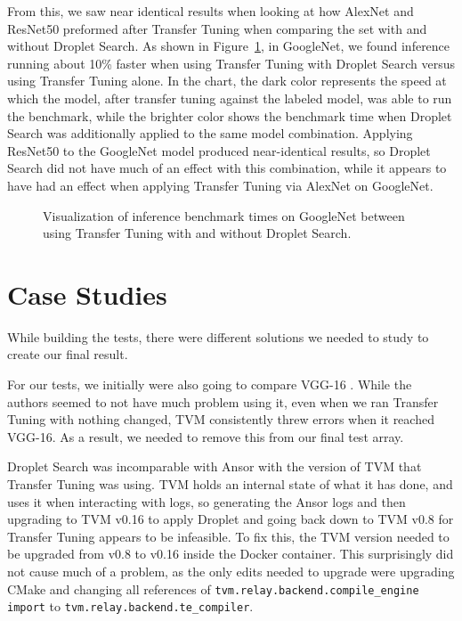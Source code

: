 \documentclass[conference]{IEEEtran}
\begin{document}
From this, we saw near identical results when looking at how AlexNet and ResNet50 preformed after Transfer Tuning when comparing the set with and without Droplet Search. As shown in Figure~\ref{fig}, in GoogleNet, we found inference running about 10\% faster when using Transfer Tuning with Droplet Search versus using Transfer Tuning alone. In the chart, the dark color represents the speed at which the model, after transfer tuning against the labeled model, was able to run the benchmark, while the brighter color shows the benchmark time when Droplet Search was additionally applied to the same model combination. Applying ResNet50 to the GoogleNet model produced near-identical results, so Droplet Search did not have much of an effect with this combination, while it appears to have had an effect when applying Transfer Tuning via AlexNet on GoogleNet.

\begin{figure}[!b]
\centerline{}
\caption{Visualization of inference benchmark times on GoogleNet between using Transfer Tuning with and without Droplet Search.}
\label{fig}
\end{figure}

\section{Case Studies}
While building the tests, there were different solutions we needed to study to create our final result. 

For our tests, we initially were also going to compare VGG-16 \cite{simonyan_very_2015}. While the authors seemed to not have much problem using it, even when we ran Transfer Tuning with nothing changed, TVM consistently threw errors when it reached VGG-16. As a result, we needed to remove this from our final test array.

Droplet Search was incomparable with Ansor with the version of TVM that Transfer Tuning was using. TVM holds an internal state of what it has done, and uses it when interacting with logs, so generating the Ansor logs and then upgrading to TVM v0.16 to apply Droplet and going back down to TVM v0.8 for Transfer Tuning appears to be infeasible. To fix this, the TVM version needed to be upgraded from v0.8 to v0.16 inside the Docker container. This surprisingly did not cause much of a problem, as the only edits needed to upgrade were upgrading CMake and changing all references of \lstinline{tvm.relay.backend.compile_engine import} to \lstinline{tvm.relay.backend.te_compiler}. 
\end{document}

